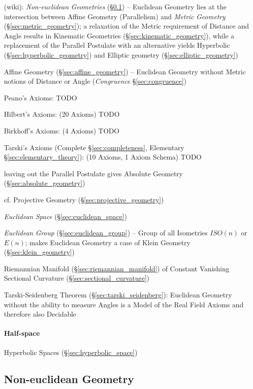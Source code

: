 (wiki): \emph{Non-euclidean Geometries} (\S\ref{sec:noneuclidean_geometry}) --
Euclidean Geometry lies at the intersection between Affine Geometry
(Parallelism) and \emph{Metric Geometry} (\S\ref{sec:metric_geometry}); a
relaxation of the Metric requirement of Distance and Angle results in Kinematic
Geometries (\S\ref{sec:kinematic_geometry}), while a replacement of the Parallel
Postulate with an alternative yields Hyperbolic
(\S\ref{sec:hyperbolic_geometry}) and Elliptic geometry
(\S\ref{sec:elliptic_geometry})

Affine Geometry (\S\ref{sec:affine_geometry}) -- Euclidean Geometry without
Metric notions of Distance or Angle (\emph{Congruence} \S\ref{sec:congruence})

Peano's Axioms: TODO

Hilbert's Axioms: (20 Axioms) TODO

Birkhoff's Axioms: (4 Axioms) TODO

Tarski's Axioms (Complete \S\ref{sec:completeness}, Elementary
\S\ref{sec:elementary_theory}): (10 Axioms, 1 Axiom Schema) TODO

\fist leaving out the Parallel Postulate gives Absolute Geometry
(\S\ref{sec:absolute_geometry})

cf. Projective Geometry (\S\ref{sec:projective_geometry})

\emph{Euclidean Space} (\S\ref{sec:euclidean_space})

\emph{Euclidean Group} (\S\ref{sec:euclidean_group}) -- Group of all
Isometries $ISO(n)$ or $E(n)$; makes Euclidean Geometry a case of
Klein Geometry (\S\ref{sec:klein_geometry})

Riemannian Manifold (\S\ref{sec:riemannian_manifold}) of Constant Vanishing
Sectional Curvature (\S\ref{sec:sectional_curvature})

Tarski-Seidenberg Theorem (\S\ref{sec:tarski_seidenberg}): Euclidean Geometry
without the ability to measure Angles is a Model of the Real Field Axioms
and therefore also Decidable



\paragraph{Half-space}\label{sec:half_space}\hfill

Hyperbolic Spaces (\S\ref{sec:hyperbolic_space})



\subsection{Non-euclidean Geometry}\label{sec:noneuclidean_geometry}

